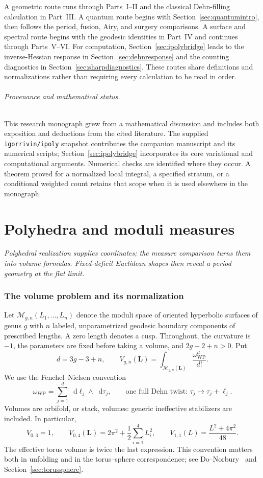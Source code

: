 \documentclass[11pt,a4paper]{article}
\newcommand{\monographpart}[2]{%
  \clearpage\part{#1}%
  \noindent\textit{#2}\par\medskip}
\numberwithin{equation}{section}
\theoremstyle{definition}
\theoremstyle{remark}
\newcommand{\dd}{\mathop{}\!\mathrm d}
\newcommand{\WP}{\mathrm{WP}}
\newcommand{\M}{\mathcal M}
\newcommand{\lengths}{\mathbf L}
\begin{document}
A geometric route runs through Parts~I--II and the classical Dehn-filling
calculation in Part~III. A quantum route begins with
Section~\ref{sec:quantumintro}, then follows the period, fusion, Airy, and
surgery comparisons. A surface and spectral route begins with the
geodesic identities in Part~IV and continues through Parts~V--VI.
For computation, Section~\ref{sec:ipolybridge} leads to the inverse-Hessian
response in Section~\ref{sec:dehnresponse} and the counting diagnostics in
Section~\ref{sec:sharpdiagnostics}. These routes share definitions and
normalizations rather than requiring every calculation to be read in order.

\paragraph{Provenance and mathematical status.}
This research monograph grew from a mathematical discussion and includes
both exposition and deductions from the cited literature. The supplied
\texttt{igorrivin/ipoly} snapshot contributes the companion manuscript
and its numerical scripts; Section~\ref{sec:ipolybridge} incorporates its
core variational and computational arguments. Numerical checks are
identified where they occur. A theorem proved for a normalized local
integral, a specified stratum, or a conditional weighted count retains
that scope when it is used elsewhere in the monograph.



\monographpart{Polyhedra and moduli measures}{Polyhedral realization supplies coordinates; the measure comparison turns them into volume formulas. Fixed-deficit Euclidean shapes then reveal a period geometry at the flat limit.}

\section{The volume problem and its normalization}
\label{sec:conventions}

Let $\M_{g,n}(L_1,\ldots,L_n)$ denote the moduli space of oriented hyperbolic
surfaces of genus $g$ with $n$ labeled, unparametrized geodesic boundary
components of prescribed lengths. A zero length denotes a cusp. Throughout,
the curvature is $-1$, the parameters are fixed before taking a volume, and
$2g-2+n>0$. Put
\[
 d=3g-3+n,\qquad
 V_{g,n}(\lengths)=\int_{\M_{g,n}(\lengths)}
                  \frac{\omega_{\WP}^{d}}{d!}.
\]
We use the Fenchel--Nielsen convention
\begin{equation}
 \omega_{\WP}=\sum_{j=1}^{d}\dd\ell_j\wedge\dd\tau_j,
 \qquad \text{one full Dehn twist: }\tau_j\longmapsto\tau_j+\ell_j.
 \label{eq:fn}
\end{equation}
Volumes are orbifold, or stack, volumes: generic ineffective stabilizers are
included. In particular,
\begin{equation}
 V_{0,3}=1,\qquad
 V_{0,4}(\lengths)=2\pi^2+\frac12\sum_{i=1}^4L_i^2,
 \qquad
 V_{1,1}(L)=\frac{L^2+4\pi^2}{48}.
 \label{eq:basevolumes}
\end{equation}
The effective torus volume is twice the last expression. This convention
matters both in unfolding and in the torus--sphere correspondence; see
Do--Norbury~\cite{DoNorbury} and Section~\ref{sec:torussphere}.
\end{document}
